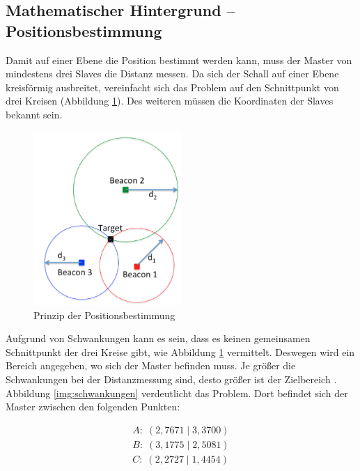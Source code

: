 \subsection{Mathematischer Hintergrund -- Positionsbestimmung}

Damit auf einer Ebene die Position bestimmt werden kann, muss der Master von mindestens drei Slaves die Distanz messen. Da sich der Schall auf einer Ebene kreisförmig ausbreitet, vereinfacht sich das Problem auf den Schnittpunkt von drei Kreisen (Abbildung \ref{img:positionsbestimmung}). Des weiteren müssen die Koordinaten der Slaves bekannt sein.
\begin{figure}[H]
        \centering
        \includegraphics[width=0.5\textwidth]{images/positionsbestimmung.png}
        \caption{Prinzip der Positionsbestimmung}
        \label{img:positionsbestimmung}
\end{figure}
Aufgrund von Schwankungen kann es sein, dass es keinen gemeinsamen Schnittpunkt der drei Kreise gibt, wie Abbildung \ref{img:positionsbestimmung} vermittelt. Deswegen wird ein Bereich angegeben, wo sich der Master befinden muss. Je größer die Schwankungen bei der Distanzmessung sind, desto größer ist der Zielbereich \cite{src_MATH_TDOA}. Abbildung \ref{img:schwankungen} verdeutlicht das Problem. Dort befindet sich der Master zwischen den folgenden Punkten:

\begin{equation}
\begin{split}
A: \; (2,7671\;|\;3,3700) \\
B: \; (3,1775\;|\;2,5081) \\
C: \; (2,2727\;|\;1,4454)
\end{split}
\end{equation}


